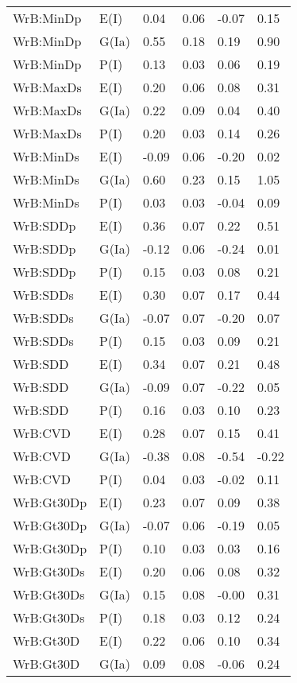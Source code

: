 \begin{center}
\begin{longtable}{|p{1.1in}|p{0.7in}|p{0.7in}|p{0.6in}|p{0.6in}|p{0.6in}|}
  WrB:MinDp & E(I) & 0.04 & 0.06 & -0.07 & 0.15 \\ 
  WrB:MinDp & G(Ia) & 0.55 & 0.18 & 0.19 & 0.90 \\ 
  WrB:MinDp & P(I) & 0.13 & 0.03 & 0.06 & 0.19 \\ 
  WrB:MaxDs & E(I) & 0.20 & 0.06 & 0.08 & 0.31 \\ 
  WrB:MaxDs & G(Ia) & 0.22 & 0.09 & 0.04 & 0.40 \\ 
  WrB:MaxDs & P(I) & 0.20 & 0.03 & 0.14 & 0.26 \\ 
  WrB:MinDs & E(I) & -0.09 & 0.06 & -0.20 & 0.02 \\ 
  WrB:MinDs & G(Ia) & 0.60 & 0.23 & 0.15 & 1.05 \\ 
  WrB:MinDs & P(I) & 0.03 & 0.03 & -0.04 & 0.09 \\ 
  WrB:SDDp & E(I) & 0.36 & 0.07 & 0.22 & 0.51 \\ 
  WrB:SDDp & G(Ia) & -0.12 & 0.06 & -0.24 & 0.01 \\ 
  WrB:SDDp & P(I) & 0.15 & 0.03 & 0.08 & 0.21 \\ 
  WrB:SDDs & E(I) & 0.30 & 0.07 & 0.17 & 0.44 \\ 
  WrB:SDDs & G(Ia) & -0.07 & 0.07 & -0.20 & 0.07 \\ 
  WrB:SDDs & P(I) & 0.15 & 0.03 & 0.09 & 0.21 \\ 
  WrB:SDD & E(I) & 0.34 & 0.07 & 0.21 & 0.48 \\ 
  WrB:SDD & G(Ia) & -0.09 & 0.07 & -0.22 & 0.05 \\ 
  WrB:SDD & P(I) & 0.16 & 0.03 & 0.10 & 0.23 \\ 
  WrB:CVD & E(I) & 0.28 & 0.07 & 0.15 & 0.41 \\ 
  WrB:CVD & G(Ia) & -0.38 & 0.08 & -0.54 & -0.22 \\ 
  WrB:CVD & P(I) & 0.04 & 0.03 & -0.02 & 0.11 \\ 
  WrB:Gt30Dp & E(I) & 0.23 & 0.07 & 0.09 & 0.38 \\ 
  WrB:Gt30Dp & G(Ia) & -0.07 & 0.06 & -0.19 & 0.05 \\ 
  WrB:Gt30Dp & P(I) & 0.10 & 0.03 & 0.03 & 0.16 \\ 
  WrB:Gt30Ds & E(I) & 0.20 & 0.06 & 0.08 & 0.32 \\ 
  WrB:Gt30Ds & G(Ia) & 0.15 & 0.08 & -0.00 & 0.31 \\ 
  WrB:Gt30Ds & P(I) & 0.18 & 0.03 & 0.12 & 0.24 \\ 
  WrB:Gt30D & E(I) & 0.22 & 0.06 & 0.10 & 0.34 \\ 
  WrB:Gt30D & G(Ia) & 0.09 & 0.08 & -0.06 & 0.24 \\ 

\end{longtable}
\end{center}
